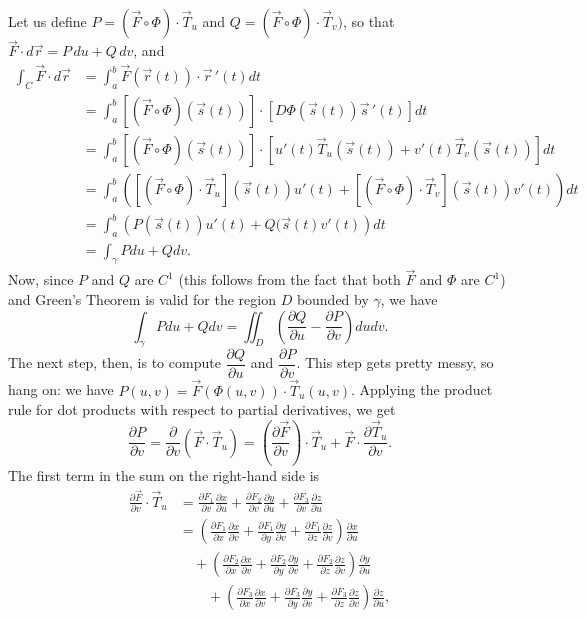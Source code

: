 Let us define $P = (\vec{F}\circ\Phi)\cdot \vec{T}_u$ and $Q = (\vec{F}\circ\Phi)\cdot \vec{T}_v)$, so that $\vec{F}\cdot d\vec{r} = P\,du+Q\,dv$, and
\begin{align*}
 \int_C \vec{F}\cdot d\vec{r} &= \int_a^b \vec{F}(\vec{r}(t))\cdot \vec{r}\,'(t)dt\\
& = \int_a^b \left[(\vec{F}\circ\Phi)(\vec{s}(t))\right]\cdot \left[D\Phi(\vec{s}(t))\vec{s}\,'(t)\right]dt\\
& = \int_a^b \left[(\vec{F}\circ\Phi)(\vec{s}(t))\right]\cdot \left[u'(t)\vec{T}_u(\vec{s}(t))+v'(t)\vec{T}_v(\vec{s}(t))\right]dt\\
& = \int_a^b \left(\left[(\vec{F}\circ\Phi)\cdot\vec{T}_u\right](\vec{s}(t))u'(t)+\left[(\vec{F}\circ\Phi)\cdot \vec{T}_v\right](\vec{s}(t))v'(t)\right)dt\\
& = \int_a^b \left(P(\vec{s}(t))u'(t)+Q(\vec{s}(t)v'(t)\right)dt\\
& = \int_\gamma Pdu+Qdv.
\end{align*}
Now, since $P$ and $Q$ are $C^1$ (this follows from the fact that both $\vec{F}$ and $\Phi$ are $C^1$) and Green's Theorem is valid for the region $D$ bounded by $\gamma$, we have
\[
 \int_\gamma Pdu+Qdv = \iint_D\left(\frac{\partial Q}{\partial u}-\frac{\partial P}{\partial v}\right)dudv.
\]
The next step, then, is to compute $\dfrac{\partial Q}{\partial u}$ and $\dfrac{\partial P}{\partial v}$. This step gets pretty messy, so hang on: we have $P(u,v) = \vec{F}(\Phi(u,v))\cdot \vec{T}_u(u,v)$. Applying the product rule for dot products with respect to partial derivatives, we get
\[
 \frac{\partial P}{\partial v}=\frac{\partial}{\partial v}\left(\vec{F}\cdot \vec{T}_u\right) = \left(\frac{\partial \vec{F}}{\partial v}\right)\cdot \vec{T}_u+\vec{F}\cdot \frac{\partial \vec{T}_u}{\partial v}.
\]
The first term in the sum on the right-hand side is
\begin{align*}
 \frac{\partial \vec{F}}{\partial v}\cdot \vec{T}_u & = \frac{\partial F_1}{\partial v}\frac{\partial x}{\partial u}+\frac{\partial F_2}{\partial v}\frac{\partial y}{\partial u}+\frac{\partial F_3}{\partial v}\frac{\partial z}{\partial u}\\
& = \left(\frac{\partial F_1}{\partial x}\frac{\partial x}{\partial v}+\frac{\partial F_1}{\partial y}\frac{\partial y}{\partial v}+\frac{\partial F_1}{\partial z}\frac{\partial z}{\partial v}\right)\frac{\partial x}{\partial u}\\
& \quad + \left(\frac{\partial F_2}{\partial x}\frac{\partial x}{\partial v}+\frac{\partial F_2}{\partial y}\frac{\partial y}{\partial v}+\frac{\partial F_2}{\partial z}\frac{\partial z}{\partial v}\right)\frac{\partial y}{\partial u}\\
& \quad\quad + \left(\frac{\partial F_3}{\partial x}\frac{\partial x}{\partial v}+\frac{\partial F_3}{\partial y}\frac{\partial y}{\partial v}+\frac{\partial F_3}{\partial z}\frac{\partial z}{\partial v}\right)\frac{\partial z}{\partial u},
\end{align*}
